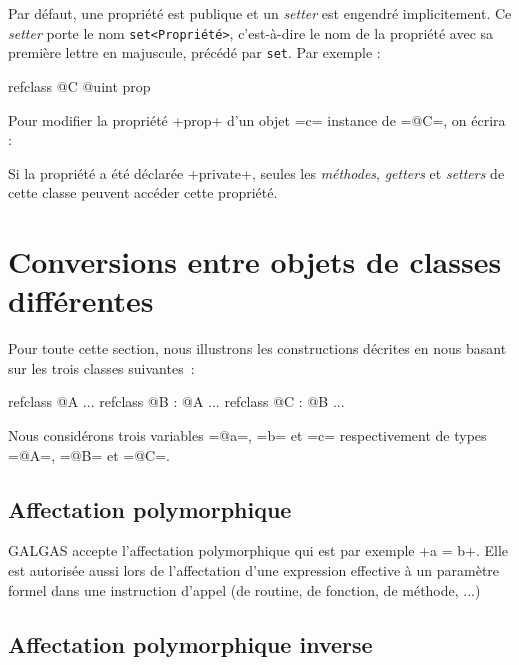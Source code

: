 Par défaut, une propriété est publique et un \emph{setter} est engendré implicitement. Ce \emph{setter} porte le nom \texttt{set<Propriété>}, c'est-à-dire le nom de la propriété avec sa première lettre en majuscule, précédé par \texttt{set}. Par exemple :

\begin{galgas3}
refclass @C {
  @uint prop
}
\end{galgas3}


Pour modifier la propriété \ggst+prop+ d'un objet \ggst=c= instance de \ggst=@C=, on écrira :

\begin{galgas3}
[!?c setProp !12]
\end{galgas3}

Si la propriété a été déclarée \ggst+private+, seules les \emph{méthodes}, \emph{getters} et \emph{setters} de cette classe peuvent accéder cette propriété.












\section{Conversions entre objets de classes différentes}

Pour toute cette section, nous illustrons les constructions décrites en nous basant sur les trois classes suivantes~:
\begin{galgas3}
refclass @A {
  ...
}
refclass @B : @A {
  ...
}
refclass @C : @B {
  ...
}
\end{galgas3}

Nous considérons trois variables \ggst=@a=, \ggst=b= et \ggst=c= respectivement de types \ggst=@A=, \ggst=@B= et \ggst=@C=.


\subsection{Affectation polymorphique}

GALGAS accepte l'affectation polymorphique qui est par exemple \ggst+a = b+. Elle est autorisée aussi lors de l'affectation d'une expression effective à un paramètre formel dans une instruction d'appel (de routine, de fonction, de méthode, ...)


\subsection{Affectation polymorphique inverse}

